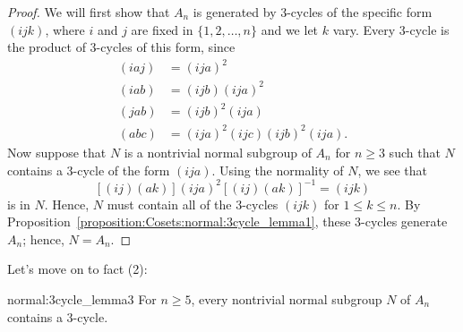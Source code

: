 
\begin{proof}
We will first show that $A_n$ is generated by 3-cycles of the specific
form $(ijk)$, where $i$ and $j$ are fixed in  $\{ 1, 2, \ldots, n \}$
and we let $k$ vary. Every 3-cycle is the product of 3-cycles of this 
form, since
\begin{align*}
(i a j) & = (i j a)^2  \\
(i a b) & = (i j b) (i j a)^2 \\
(j a b) & = (i j b)^2 (i j a) \\
(a b c) & = (i j a)^2 (i j c) (i j b)^2 (i j a).
\end{align*}
Now suppose that $N$ is a nontrivial normal subgroup of $A_n$ for $n 
\geq 3$  such that $N$ contains a 3-cycle of the form $(i j a)$. Using
the normality of $N$, we see that
\[
[(i j)(a k)](i j a)^2 [(i j)(a k)]^{-1} = (i j k)
\]
is in $N$. Hence, $N$ must contain all of the 3-cycles $(i j k)$ 
for $1 \leq k \leq n$. By Proposition~\ref{proposition:Cosets:normal:3cycle_lemma1}, these 3-cycles generate $A_n$; 
hence, $N = A_n$. 
\end{proof}
\bigskip
 
\noindent
Let's move on to fact (2):

\begin{prop}{normal:3cycle_lemma3}
For $n \geq 5$, every nontrivial normal subgroup $N$ of $A_n$ contains a
$3$-cycle. 
\end{prop}

 
